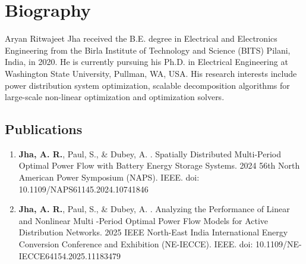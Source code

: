 \clearpage
\section{Biography}
\small
Aryan Ritwajeet Jha received the B.E. degree in Electrical and Electronics Engineering from the Birla Institute of Technology and Science (BITS) Pilani, India, in 2020. He is currently pursuing his Ph.D. in Electrical Engineering at Washington State University, Pullman, WA, USA. His research interests include power distribution system optimization, scalable decomposition algorithms for large-scale non-linear optimization and optimization solvers.
\singlespacing

\subsection{Publications}
\small
\begin{enumerate}
    \item \textbf{Jha, A. R.}, Paul, S., \& Dubey, A. . Spatially Distributed Multi-Period Optimal Power Flow with Battery Energy Storage Systems. 2024 56th North American Power Symposium (NAPS). IEEE. doi: 10.1109/NAPS61145.2024.10741846 \cite{Jha2024}
    \item \textbf{Jha, A. R.}, Paul, S., \& Dubey, A. . Analyzing the Performance of Linear and Nonlinear Multi -Period Optimal Power Flow Models for Active Distribution Networks. 2025 IEEE North-East India International Energy Conversion Conference and Exhibition (NE-IECCE). IEEE. doi: 10.1109/NE-IECCE64154.2025.11183479 \cite{Jha2025}
\end{enumerate}


\clearpage
